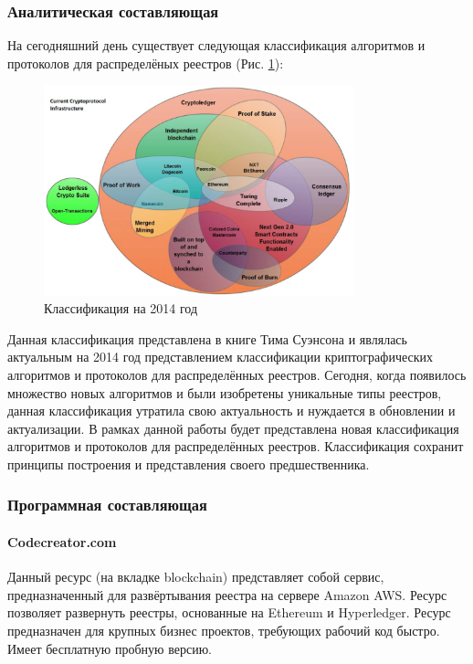 \subsubsection{Аналитическая составляющая}
На сегодняшний день существует следующая классификация алгоритмов и протоколов
для распределёных реестров (Рис. \ref{2014protocol}):

\begin{figure}[h!]
    \centering
    \includegraphics[width=0.8\textwidth]{./images/current_protocols}
    \caption{Классификация на 2014 год \cite{TimSwanson2014}}\label{2014protocol}
\end{figure}

Данная классификация представлена в книге Тима Суэнсона \cite{TimSwanson2014} и
являлась актуальным на 2014 год представлением классификации криптографических
алгоритмов и протоколов для распределённых реестров. Сегодня, когда появилось
множество новых алгоритмов и были изобретены уникальные типы реестров, данная
классификация утратила свою актуальность и нуждается в обновлении и
актуализации. В рамках данной работы будет представлена новая классификация
алгоритмов и протоколов для распределённых реестров. Классификация сохранит
принципы построения и представления своего предшественника.

\subsubsection{Программная составляющая}
\paragraph{Codecreator.com}
Данный ресурс \cite{CodeCreator} (на вкладке blockchain) представляет собой
сервис, предназначенный для развёртывания реестра на сервере Amazon AWS. Ресурс
позволяет развернуть реестры, основанные на Ethereum и Hyperledger. Ресурс
предназначен для крупных бизнес проектов, требующих рабочий код быстро. Имеет
бесплатную пробную версию.

